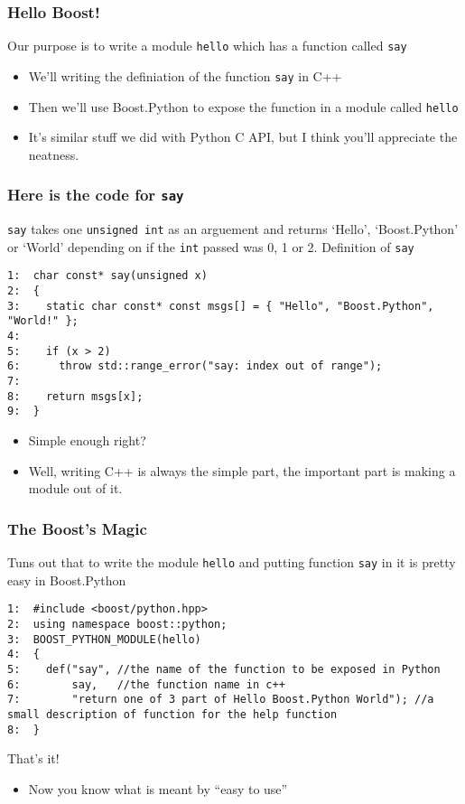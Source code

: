 \documentclass{beamer}
\begin{document}
\begin{frame}
\frametitle{Hello Boost!}
\label{sec-2_4}

   Our purpose is to write a module \texttt{hello} which has a function called \texttt{say}

\begin{itemize}
\item We'll writing the definiation of the function \texttt{say} in C++
\item Then we'll use Boost.Python to expose the function in a module called \texttt{hello}
\item It's similar stuff we did with Python C API, but I think you'll appreciate the neatness.
\end{itemize}
\end{frame}
\begin{frame}[fragile]
\frametitle{Here is the code for \texttt{say}}
\label{sec-2_5}

   \texttt{say} takes one \texttt{unsigned int} as an arguement and returns `Hello', `Boost.Python' or 
   `World' depending on if the \texttt{int} passed was 0, 1 or 2.
   Definition of \texttt{say}
\begin{verbatim}
1:  char const* say(unsigned x)
2:  {
3:    static char const* const msgs[] = { "Hello", "Boost.Python", "World!" };
4:  
5:    if (x > 2) 
6:      throw std::range_error("say: index out of range");
7:  
8:    return msgs[x];
9:  }
\end{verbatim}

\begin{itemize}
\item Simple enough right?
\item Well, writing C++ is always the simple part, the important part is making a module out of it.
\end{itemize}
\end{frame}
\begin{frame}[fragile]
\frametitle{The Boost's Magic}
\label{sec-2_6}

   Tuns out that to write the module \texttt{hello} and putting function \texttt{say} in it is pretty easy in Boost.Python
\begin{verbatim}
1:  #include <boost/python.hpp>
2:  using namespace boost::python;
3:  BOOST_PYTHON_MODULE(hello)
4:  {
5:    def("say", //the name of the function to be exposed in Python
6:        say,   //the function name in c++
7:        "return one of 3 part of Hello Boost.Python World"); //a small description of function for the help function
8:  }
\end{verbatim}
   That's it!

\begin{itemize}
\item Now you know what is meant by ``easy to use''
\end{itemize}
\end{frame}
\end{document}
